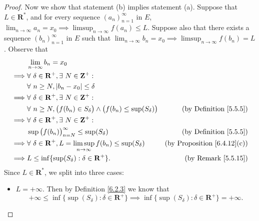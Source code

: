\begin{proof}
    Now we show that statement (b) implies statement (a).
    Suppose that \(L \in \mathbf{R}^*\), and for every sequence \((a_n)_{n = 1}^\infty\) in \(E\), \(\lim_{n \to \infty} a_n = x_0 \implies \limsup_{n \to \infty} f(a_n) \leq L\).
    Suppose also that there exists a sequence \((b_n)_{n = 1}^\infty\) in \(E\) such that \(\lim_{n \to \infty} b_n = x_0 \implies \limsup_{n \to \infty} f(b_n) = L\).
    Observe that
    \begin{align*}
                 & \lim_{n \to \infty} b_n = x_0                                                                                                             \\
        \implies & \forall\ \delta \in \mathbf{R}^+, \exists\ N \in \mathbf{Z}^+ :                                                                           \\
                 & \forall\ n \geq N, \abs*{b_n - x_0} \leq \delta                                                                                           \\
        \implies & \forall\ \delta \in \mathbf{R}^+, \exists\ N \in \mathbf{Z}^+ :                                                                           \\
                 & \forall\ n \geq N, \big(f(b_n) \in S_{\delta}\big) \land \big(f(b_n) \leq \sup(S_{\delta})\big) & \text{(by Definition \ref{5.5.5})}      \\
        \implies & \forall\ \delta \in \mathbf{R}^+, \exists\ N \in \mathbf{Z}^+ :                                                                           \\
                 & \sup\big(f(b_n)\big)_{n = N}^\infty \leq \sup(S_{\delta})                                       & \text{(by Definition \ref{5.5.5})}      \\
        \implies & \forall\ \delta \in \mathbf{R}^+, L = \limsup_{n \to \infty} f(b_n) \leq \sup(S_{\delta})       & \text{(by Proposition \ref{6.4.12}(c))} \\
        \implies & L \leq \inf\{\sup(S_{\delta}) : \delta \in \mathbf{R}^+\}.                                      & \text{(by Remark \ref{5.5.15})}
    \end{align*}
    Since \(L \in \mathbf{R}^*\), we split into three cases:
    \begin{itemize}
        \item \(L = +\infty\).
              Then by Definition \ref{6.2.3} we know that
              \[
                  +\infty \leq \inf\{\sup(S_{\delta}) : \delta \in \mathbf{R}^+\} \implies \inf\{\sup(S_{\delta}) : \delta \in \mathbf{R}^+\} = +\infty.
\]
\end{itemize}
\end{proof}
